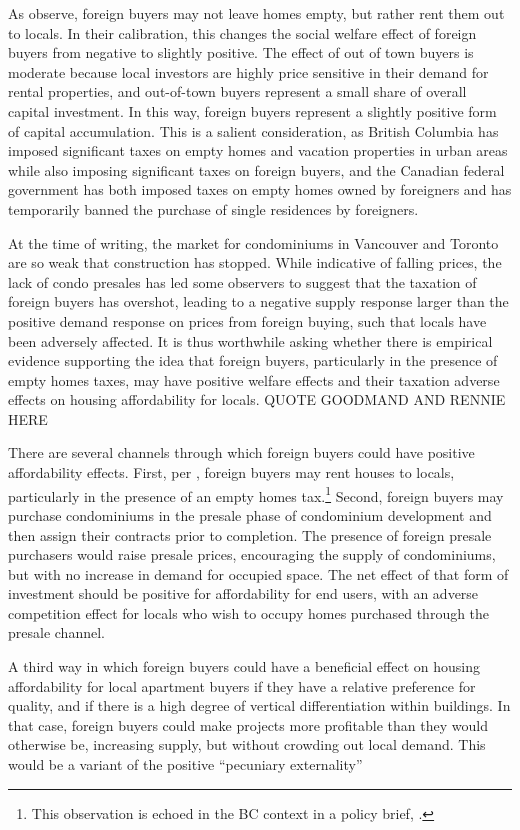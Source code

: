 \documentclass[12pt]{article}
\begin{document}
As \textcite{favilukisVanNieuwerburgh} observe, foreign buyers may not leave
homes empty, but rather rent them out to locals. In their calibration, this
changes the social welfare effect of foreign buyers from negative to slightly
positive. The effect of out of town buyers is moderate because local investors
are highly price sensitive in their demand for rental properties, and out-of-town
buyers represent a small share of overall capital investment. In this way,
foreign buyers represent a slightly positive form of capital accumulation. This
is a salient consideration, as British Columbia has imposed significant taxes on empty
homes and vacation properties in urban areas while also imposing significant
taxes on foreign buyers, and the Canadian federal government has both imposed
taxes on empty homes owned by foreigners and has temporarily banned the
purchase of single residences by foreigners.

At the time of writing, the market for condominiums in Vancouver and Toronto
are so weak that construction has stopped. While indicative of falling prices,
the lack of condo presales has led some observers to suggest that the taxation
of foreign buyers has overshot, leading to a negative supply response larger
than the positive demand response on prices from foreign buying, such that
locals have been adversely affected. It is thus worthwhile asking whether there
is empirical evidence supporting the idea that foreign buyers, particularly in
the presence of empty homes taxes, may have positive welfare effects and their
taxation adverse effects on housing affordability for locals. QUOTE GOODMAND AND RENNIE HERE

There are several channels through which foreign buyers could have positive
affordability effects. First, per \textcite{favilukisVanNieuwerburgh}, foreign
buyers may rent houses to locals, particularly in the presence of an empty
homes tax.\footnote{This observation is echoed in the BC context in a policy
brief, \textcite{Goodman}.} Second, foreign buyers may purchase condominiums in
the presale phase of condominium development and then assign their contracts
prior to completion. The presence of foreign presale purchasers would raise
presale prices, encouraging the supply of condominiums, but with no increase in
demand for occupied space. The net effect of that form of investment should be
positive for affordability for end users, with an adverse competition effect
for locals who wish to occupy homes purchased through the presale channel.

A third way in which foreign buyers could have a beneficial effect on
housing affordability for local apartment buyers if they have a relative
preference for quality, and if there is a high degree of vertical
differentiation within buildings. In that case, foreign buyers could make
projects more profitable than they would otherwise be, increasing supply, but
without crowding out local demand. This would be a variant of the positive
``pecuniary externality''
\end{document}
